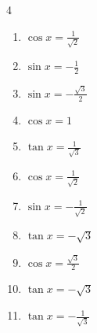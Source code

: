 \begin{multicols}{4}
\begin{enumerate}
  \item $\displaystyle \cos{x}  = \frac{1}{\sqrt{2}}$


  \item $\displaystyle \sin{x}  = -\frac{1}{2}$


\columnbreak %

  \item $\displaystyle \sin{x}  = -\frac{\sqrt{3}}{2}$


  \item $\displaystyle \cos{x}  = 1$


  \item $\displaystyle \tan{x}  = \frac{1}{\sqrt{3}}$


  \item $\displaystyle \cos{x}  = \frac{1}{\sqrt{2}}$


  \item $\displaystyle \sin{x}  = -\frac{1}{\sqrt{2}}$


  \item $\displaystyle \tan{x}  = -\sqrt{3}$


  \item $\displaystyle \cos{x}  = \frac{\sqrt{3}}{2}$


  \item $\displaystyle \tan{x}  = -\sqrt{3}$


  \item $\displaystyle \tan{x}  = -\frac{1}{\sqrt{3}}$



\end{enumerate}
\end{multicols}
